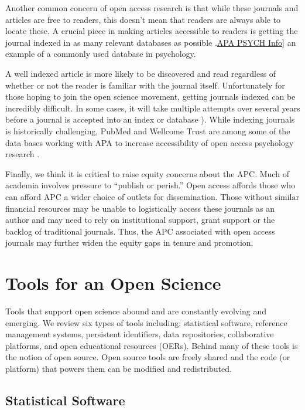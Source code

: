 \documentclass[
  11pt,
]{book}
\begin{document}
Another common concern of open access research is that while these journals and articles are free to readers, this doesn't mean that readers are always able to locate these. A crucial piece in making articles accessible to readers is getting the journal indexed in as many relevant databases as possible \citep{fortney_getting_2016}.\href{https://www.apa.org/pubs/databases/psycinfois}{APA PSYCH Info}{]} an example of a commonly used database in psychology.

A well indexed article is more likely to be discovered and read regardless of whether or not the reader is familiar with the journal itself. Unfortunately for those hoping to join the open science movement, getting journals indexed can be incredibly difficult. In some cases, it will take multiple attempts over several years before a journal is accepted into an index or database \citep{fortney_getting_2016, shah_open_2017}). While indexing journals is historically challenging, PubMed and Wellcome Trust are among some of the data bases working with APA to increase accessibility of open access psychology research \citep{martone_data_2018}.

Finally, we think it is critical to raise equity concerns about the APC. Much of academia involves pressure to ``publish or perish.'' Open access affords those who can afford APC a wider choice of outlets for dissemination. Those without similar financial resources may be unable to logistically access these journals as an author and may need to rely on institutional support, grant support or the backlog of traditional journals. Thus, the APC associated with open access journals may further widen the equity gaps in tenure and promotion.

\hypertarget{tools-for-an-open-science}{%
\section{Tools for an Open Science}\label{tools-for-an-open-science}}

Tools that support open science abound and are constantly evolving and emerging. We review six types of tools including: statistical software, reference management systems, persistent identifiers, data repositories, collaborative platforms, and open educational resources (OERs). Behind many of these tools is the notion of open source. Open source tools are freely shared and the code (or platform) that powers them can be modified and redistributed.

\hypertarget{statistical-software}{%
\subsection{Statistical Software}\label{statistical-software}}
\end{document}
